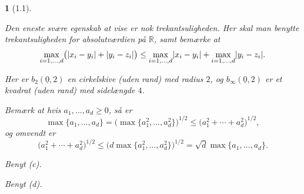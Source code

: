 \documentclass[a4paper, 11pt, article, danish, oneside]{memoir}
\newcommand{\reals}{\mathbb{R}}
\newcommand{\blank}{\mathrel{\;\cdot\;}}
\newcommand{\blankifempty}[1]{\ifstrempty{#1}{\blank}{#1}}
\DeclarePairedDelimiter{\auxdelimlvert}{\lvert}{\rvert}
\newcommand{\abs}[1]{\auxdelimlvert{\blankifempty{#1}}}
\newcommand{\pencilsymbol}{\raisebox{-2pt}{\normalfont\PencilLeft}}
\theoremstyle{changedotcustomnumber}
\theoremstyle{changedotbreakcustomnumber}
\newtheorem{opgavebreak}{\pencilsymbol}
\begin{document}
\begin{opgavebreak}[1.1]
\begin{solutionsec}
    \item Den eneste svære egenskab at vise er nok trekantsuligheden. Her skal man benytte trekantsuligheden for absolutværdien på $\reals$, samt bemærke at
    \begin{equation*}
        \max_{i=1,\ldots,d} \bigl( \abs{x_i - y_i} + \abs{y_i - z_i} \bigr)
            \leq \max_{i=1,\ldots,d} \abs{x_i - y_i} + \max_{i=1,\ldots,d} \abs{y_i - z_i}.
    \end{equation*}

    \item Her er $b_2(\underline{0},2)$ en cirkelskive (uden rand) med radius $2$, og $b_\infty(\underline{0},2)$ er et kvadrat (uden rand) med sidelængde $4$.

    \item Bemærk at hvis $a_1, \ldots, a_d \geq 0$, så er
    \begin{equation*}
        \max\{a_1, \ldots, a_d\}
            = \bigl( \max\{a_1^2, \ldots, a_d^2\} \bigr)^{1/2}
            \leq \bigl( a_1^2 + \cdots + a_d^2 \bigr)^{1/2},
    \end{equation*}
    og omvendt er
    \begin{equation*}
        \bigl( a_1^2 + \cdots + a_d^2 \bigr)^{1/2}
            \leq \bigl( d \max\{a_1^2, \ldots, a_d^2\} \bigr)^{1/2}
            = \sqrt{d} \max\{a_1, \ldots, a_d\}.
    \end{equation*}

    \item Benyt (c).

    \item Benyt (d).
\end{solutionsec}
\end{opgavebreak}
\end{document}
